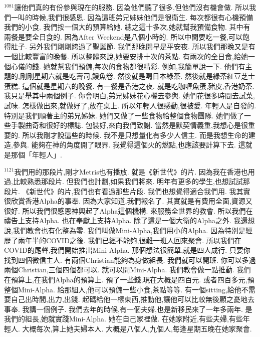\documentclass{book}
\begin{document}
$^{1081}$讓他們真的有份參與現在的服務.
因為他們聽了很多,但他們沒有機會做.
所以我們一叫的時候,我們很感恩.
因為這班弟兄姊妹他們是很衛生.
每次都很有心機預備我們的小食.
我們按一個大的預算給她.
總之這十多次,她就幫我預備食物.
其中有兩餐是要全日食的.
因為After Weekend是八個小時的.
所以中間要吃一餐,可以飽得肚子.
另外我們剛剛跨過了聖誕節.
我們那晚開早是平安夜.
所以我們那晚又是有一個比較豐富的晚餐.
所以整體來說,她要安排十次的茶點.
有兩次的全日食,給她一個心儀的錢.
她就幫我們預備,每次的食物都很精彩.
例如,我簡單說一下.
他們有主題的,剛剛星期六就是吃壽司,鰻魚卷.
然後就是喝日本綠茶.
然後就是綠茶紅豆芝士蛋糕.
這個就是星期六的晚餐.
有一餐是香港之夜.
就是吃咖喱魚蛋,豬皮,香港奶茶.
我只是舉其中兩個例子.
你會明白,弟兄姊妹花心機去參與.
她們花很多時間去試菜,試味.
怎樣做出來,就做好了,放在桌上.
所以年輕人很感動,很被愛.
年輕人是自發的.
特別是我們順著主的弟兄姊妹.
她們又做了一些食物給整個食物團隊.
她們做了一些手製曲奇和很好的標誌.
包裝好,來向我們致謝.
當然是默契情義重,我想心是很重要的.
所以我剛才說這些的時候.
我不是只想量化有多少人信主.
而是我想生命的建造,參與.
能夠在神的角度開了眼界.
我覺得這個火的燃點,也應該要計算下去.
這就是那個「年輕人」.

$^{1121}$我們用的那段片,剛才Metris也有播放.
就是《新世代》的片.
因為我在香港也用過,比較熟悉那段片.
但我們也計劃,如果我們將來.
明年有更多的學生,也想試試那段片.
《新世代》的片,我們也有看過那些片段.
我們也想覺得適合我們用.
我其實很欣賞香港Alpha的事奉.
因為大家知道,我們報名了.
其實就是有費用全面,資源又很好.
所以我們很感恩神興起了Alpha這個機構.
來服務全世界的教會.
所以我們在禱告上支持Alpha.
也在奉獻上支持Alpha.
除了這是一個大衛的Alpha之外.
我還想說,我們教會也有化整為零.
我們叫做Mini-Alpha,我們用小的Alpha.
因為特別是經歷了兩年半的COVID之後.
我們已經不能夠,很難一班人回來聚會.
所以我們在COVID的尾聲,我們開始推出Mini-Alpha.
那個想法很簡單,就是四人成行.
只要你找到四個微信主人.
有兩個Christian能夠為身做組長.
我們就可以開班.
你可以多過兩個Christian,三個四個都可以.
就可以開Mini-Alpha.
我們教會做一點推動.
我們在預算上,在我們Alpha的預算上.
預了一些錢,現在大概是四百元.
或者四百多元,預整個Mini-Alpha.
給那組人,他可以預備一些小食,茶點等等.
有一個sitting,給他不需要自己出時間,出力,出錢.
起碼給他一樣東西,推動他,讓他可以比較無後顧之憂地去事奉.
我講一個例子.
我們去年的時候,有一個夫婦,也是新移民來了一年多兩年.
是我們的組長,她就實踐Mini-Alpha.
她在自己家裡做.
在她家附近,有些夫婦,有些年輕人.
大概每次,算上她夫婦本人.
大概是八個人,九個人,每逢星期五晚在她家聚會.
\end{document}
